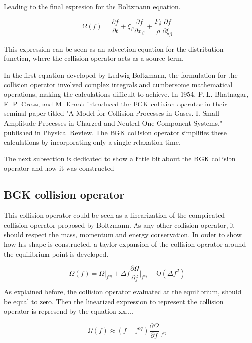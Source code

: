 Leading to the final expresion for the Boltzmann equation.

\begin{equation}
	\Omega(f) = \frac{\partial f}{\partial t} 
	+ \xi_{\beta}\frac{\partial f}{\partial x_{\beta}}
	+ \frac{F_{\beta}}{\rho}\frac{\partial f}{\partial \xi_{\beta}}
\end{equation}

This expression can be seen as an advection equation for the distribution 
function, where the collision operator acts as a source term.

In the first equation developed by Ludwig Boltzmann, the formulation for
the collision operator involved complex integrals and cumbersome mathematical 
operations, making the calculations difficult to achieve. In 1954, 
P. L. Bhatnagar, E. P. Gross, and M. Krook introduced the BGK collision 
operator in their seminal paper titled "A Model for Collision Processes 
in Gases. I. Small Amplitude Processes in Charged and Neutral One-Component 
Systems," published in Physical Review. The BGK collision operator 
simplifies these calculations by incorporating only a single relaxation time.

The next subsection is dedicated to show a little bit about the BGK collision 
operator and how it was constructed.

\subsection{BGK collision operator}
This collision operator could be seen as a linearization of the complicated 
collision operator proposed by Boltzmann. As any other collision operator,
it should respect the mass, momentum and energy conservation. In order to show
how his shape is constructed, a taylor expansion of the collision operator
around the equilibrium point is developed.

\begin{equation}
	\Omega(f) = \Omega|_{f^{eq}} 
	+ \Delta f \frac{\partial \Omega}{\partial f} \bigg|_{f^{eq}} 
	+ \mathrm{O}(\Delta f^2)
\end{equation}

As explained before, the collision operator evaluated at the equilibrium, should 
be equal to zero. Then the linearized expression to represent the collision
operator is represend by the equation xx....

\begin{equation}
	\Omega(f) \approx 
	(f-f^{eq}) \frac{\partial \Omega}{\partial f} \bigg|_{f^{eq}} 
\end{equation}


